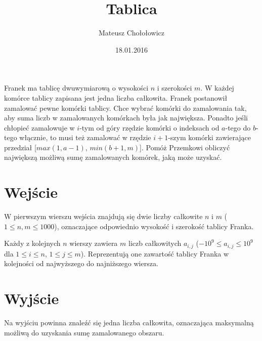 \documentclass[zad,zawodnik,utf8]{sinol}
\title{Tablica}
\author{Mateusz Chołołowicz} %
\date{18.01.2016}
\begin{document}
  \begin{tasktext}%
Franek ma tablicę dwuwymiarową o wysokości $n$ i szerokości $m$. W każdej komórce tablicy zapisana jest
jedna liczba całkowita.
Franek postanowił zamalować pewne komórki tablicy. Chce wybrać komórki do zamalowania tak, aby
suma liczb w zamalowanych komórkach była jak największa. Ponadto jeśli chłopieć zamalowuje w $i$-tym od góry rzędzie
komórki o indeksach od $a$-tego do $b$-tego włącznie, to musi też zamalować w rzędzie $i+1$-szym komórki 
zawierające przedział [$max(1, a-1)$, $min(b+1,m)$].
Pomóż Przemkowi obliczyć największą możliwą sumę zamalowanych komórek, jaką może uzyskać.

 \section{Wejście}
    
W pierwszym wierszu wejścia znajdują się dwie liczby całkowite $n$ i $m$ ($1 \leq n, m \leq 1000$), oznaczające odpowiednio
wysokość i szerokość tablicy Franka.

Każdy z kolejnych $n$ wierszy zawiera $m$ liczb całkowitych 
$a_{i,j}$ ($-10^9 \leq a_{i,j} \leq 10^9$ dla $1 \leq i \leq n$, $1 \leq j \leq m$).
Reprezentują one zawartość tablicy Franka w kolejności od najwyższego do najniższego wiersza.

  \section{Wyjście}
    Na wyjściu powinna znaleźć się jedna liczba całkowita, oznaczająca maksymalną możliwą do uzyskania sumę zamalowanego obszaru.

     \makecompactexample

  \end{tasktext}
\end{document}
